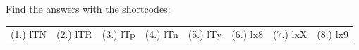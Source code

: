 \begin{eocexercises}{}
\par {} Find the answers with the shortcodes:
\par \begin{tabular}[h]{cccccc}
(1.) lTN  &  (2.) lTR  &  (3.) lTp  &  (4.) lTn  &  (5.) lTy  &  (6.) lx8  &  (7.) lxX  &  (8.) lx9  & \end{tabular}
\end{eocexercises}